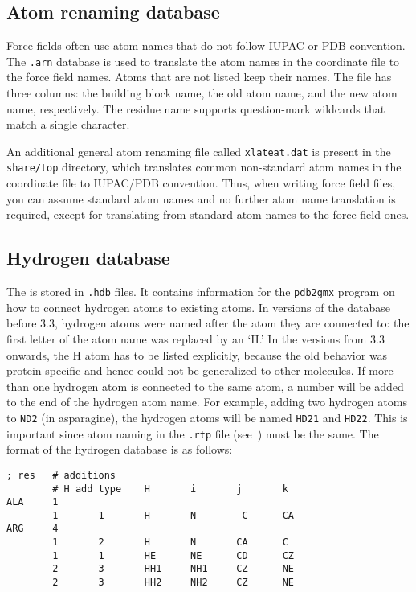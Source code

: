\subsection{Atom renaming database}
Force fields often use atom names that do not follow IUPAC or PDB convention.
The {\tt .arn} database is used to translate the atom names in the coordinate
file to the force field names. Atoms that are not listed keep their names.
The file has three columns: the building block name,
the old atom name, and the new atom name, respectively. The residue name
supports question-mark wildcards that match a single character.

An additional general atom renaming file called {\tt xlateat.dat} is present
in the {\tt share/top} directory, which translates common non-standard
atom names in the coordinate file to IUPAC/PDB convention. Thus, when writing
force field files, you can assume standard atom names and no further
atom name translation is required, except for translating from standard atom names
to the force field ones.

\subsection{Hydrogen database}
\label{subsec:hdb}
The  is stored in {\tt .hdb} files. It
contains information for the {\tt pdb2gmx} program on how to connect
hydrogen atoms to existing atoms. In versions of the database before
{\gromacs} 3.3, hydrogen atoms were named after the atom they are
connected to: the first letter of the atom name was replaced by an
`H.' In the versions from 3.3 onwards, the H atom has to be listed explicitly,
because the old behavior was protein-specific and hence could not
be generalized to other molecules.
If more than one hydrogen atom is connected to the same atom, a
number will be added to the end of the hydrogen atom name. For
example, adding two hydrogen atoms to \texttt{ND2} (in asparagine), the
hydrogen atoms will be named \texttt{HD21} and \texttt{HD22}. This is
important since atom naming in the \texttt{.rtp} file (see~)
must be the same. The format of the hydrogen database is as follows:

{\small
\begin{verbatim}
; res   # additions
        # H add type    H       i       j       k
ALA     1
        1       1       H       N       -C      CA
ARG     4
        1       2       H       N       CA      C
        1       1       HE      NE      CD      CZ
        2       3       HH1     NH1     CZ      NE
        2       3       HH2     NH2     CZ      NE
\end{verbatim}}

